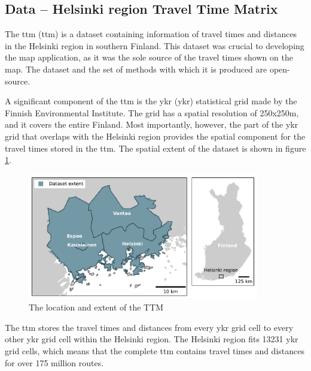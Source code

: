 \subsection{Data -- Helsinki region Travel Time Matrix}

The \acrlong{ttm} (\acrshort{ttm}) \parencite{fin2023}
is a dataset containing information of travel times and distances
in the Helsinki region in southern Finland.
This dataset was crucial to developing the map application,
as it was the sole source of the travel times shown on the map.
The dataset and the set of methods with which it is produced are open-source.

A significant component of the \acrshort{ttm} is the \acrlong{ykr} (\acrshort{ykr})
statistical grid made by the Finnish Environmental Institute.
The grid has a spatial resolution of 250x250m, and it covers the entire Finland.
Most importantly, however, the part of the \acrshort{ykr} grid that overlaps with
the Helsinki region provides the spatial component for
the travel times stored in the \acrshort{ttm}.
The spatial extent of the dataset is shown in figure \ref{fig:ttm extent}.

\begin{figure}[H]
	\centering
	\includegraphics[width=0.9\textwidth]{visual/figures/ttm/ttm_extent}
	\caption{The location and extent of the TTM}
	\label{fig:ttm extent}
\end{figure}

The \acrshort{ttm} stores the travel times and distances
from every \acrshort{ykr} grid cell to every other  \acrshort{ykr} grid cell
within the Helsinki region.
The Helsinki region fits 13231 \acrshort{ykr} grid cells,
which means that the complete \acrshort{ttm} contains travel times and distances for
over 175 million routes.

